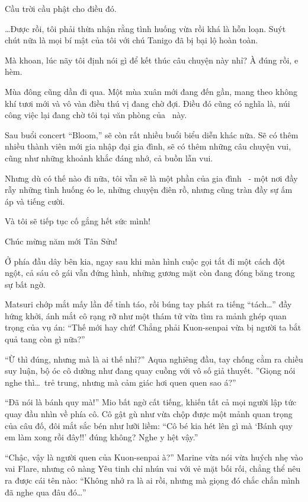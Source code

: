 \documentclass[../main.tex]{subfiles}
\begin{document}
Cầu trời cầu phật cho điều đó.

\il

\dots Được rồi, tôi phải thừa nhận rằng tình huống vừa rồi khá là hỗn loạn. Suýt chút nữa là mọi bí mật của tôi với chú Tanigo đã bị bại lộ hoàn toàn.

Mà khoan, lúc nãy tôi định nói gì để kết thúc câu chuyện này nhỉ? À đúng rồi, e hèm.

Mùa đông cũng dần đi qua. Một mùa xuân mới đang đến gần, mang theo không khí tươi mới và vô vàn điều thú vị đang chờ đợi. Điều đó cũng có nghĩa là, núi công việc lại đang chờ tôi tại văn phòng của \hll\ này.

Sau buổi concert ``Bloom,'' sẽ còn rất nhiều buổi biểu diễn khác nữa. Sẽ có thêm nhiều thành viên mới gia nhập đại gia đình, sẽ có thêm những câu chuyện vui, cũng như những khoảnh khắc đáng nhớ, cả buồn lẫn vui.

Nhưng dù có thế nào đi nữa, tôi vẫn sẽ là một phần của gia đình \hll\ - một nơi đầy rẫy những tình huống éo le, những chuyện điên rồ, nhưng cũng tràn đầy sự ấm áp và tiếng cười.

Và tôi sẽ tiếp tục cố gắng hết sức mình!

Chúc mừng năm mới Tân Sửu!

\pov{-}

Ở phía đầu dây bên kia, ngay sau khi màn hình cuộc gọi tắt đi một cách đột ngột, cả sáu cô gái vẫn đứng hình, những gương mặt còn đang đóng băng trong sự bất ngờ.

Matsuri chớp mắt mấy lần để tỉnh táo, rồi búng tay phát ra tiếng ``tách\dots'' đầy hứng khởi, ánh mắt cô rạng rỡ như một thám tử vừa tìm ra mảnh ghép quan trọng của vụ án: ``Thế mới hay chứ! Chẳng phải Kuon-senpai vừa bị người ta bắt quả tang còn gì nữa?''

``Ừ thì đúng, nhưng mà là ai thế nhỉ?'' Aqua nghiêng đầu, tay chống cằm ra chiều suy luận, bộ óc cô dường như đang quay cuồng với vô số giả thuyết. ''Giọng nói nghe thì\dots\ trẻ trung, nhưng mà cảm giác hơi quen quen sao á?''

``Đã nói là bánh quy mà!'' Mio bất ngờ cất tiếng, khiến tất cả mọi người lập tức quay đầu nhìn về phía cô. Cô gật gù như vừa chộp được một mảnh quan trọng của câu đố, đôi mắt sắc bén như lưỡi liềm: ``Cô bé kia hét lên gì mà `Bánh quy em làm xong rồi đây!!' đúng không? Nghe y hệt vậy.''

``Chậc, vậy là người quen của Kuon-senpai à?'' Marine vừa nói vừa huých nhẹ vào vai Flare, nhưng cô nàng Yêu tinh chỉ nhún vai với vẻ mặt bối rối, chẳng thể nêu ra được cái tên nào: ``Không nhớ ra là ai rồi, nhưng mà giọng đó chắc chắn mình đã nghe qua đâu đó\dots''
\end{document}
